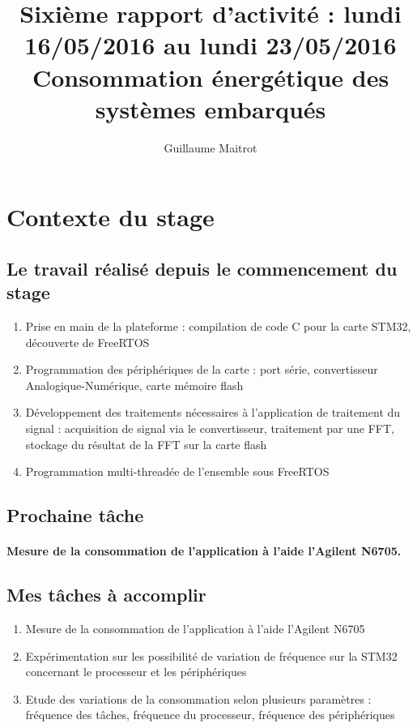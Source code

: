 \documentclass[a4paper]{article}
\title{Sixième rapport d'activité : lundi 16/05/2016 au lundi 23/05/2016 }
\author{Guillaume Maitrot}
\begin{document}
\maketitle

\begin{center}
\centering
\title{Consommation énergétique des systèmes embarqués}
\end{center}

\section{Contexte du stage}

 \subsection{Le travail réalisé depuis le commencement du stage}
 \begin{enumerate}
\item {Prise en main de la plateforme : compilation de code C pour la carte STM32, découverte de FreeRTOS}
\item {Programmation des périphériques de la carte : port série,
convertisseur Analogique-Numérique, carte mémoire flash}
\item {Développement des traitements nécessaires à l'application de
traitement du signal : acquisition de signal via le convertisseur,
traitement par une FFT, stockage du résultat de la FFT sur la carte
flash}
\item { Programmation multi-threadée de l'ensemble sous FreeRTOS}
\end{enumerate}

 \subsection{Prochaine tâche}
    \paragraph{Mesure de la consommation de l'application à l'aide l'Agilent
N6705.}
    
\subsection{Mes tâches à accomplir}
\begin{enumerate}
\item {Mesure de la consommation de l'application à l'aide l'Agilent
N6705}
\item {Expérimentation sur les possibilité de variation de fréquence sur la
STM32 concernant le processeur et les périphériques}
\item {Etude des variations de la consommation selon plusieurs paramètres :
fréquence des tâches, fréquence du processeur, fréquence des
périphériques}
\end{enumerate}
\end{document}
